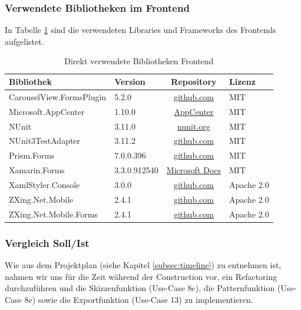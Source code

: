 \subsubsection{Verwendete Bibliotheken im Frontend}
In Tabelle \ref{tab:verwendete-libraries-frontend} sind die verwendeten Libraries und Frameworks des Frontends aufgelistet.
\begin{table}[!h]
	\centering
	\begin{tabular}{| l | l | c | l |}
		\hline
		\textbf{Bibliothek} & \textbf{Version} & \textbf{Repository} & \textbf{Lizenz}\\
		\hline
		CarouselView.FormsPlugin & 5.2.0 & \href{https://github.com/alexrainman/CarouselView}{github.com} & MIT \\
		Microsoft.AppCenter & 1.10.0 & \href{https://visualstudio.microsoft.com/app-center/}{AppCenter} & MIT \\
		NUnit & 3.11.0 & \href{http://nunit.org}{nunit.org} & MIT\\
		NUnit3TestAdapter & 3.11.2 & \href{https://github.com/nunit/docs/wiki/Visual-Studio-Test-Adapter}{github.com} & MIT\\
		Prism.Forms & 7.0.0.396 & \href{https://github.com/PrismLibrary/Prism}{github.com} & MIT \\
		Xamarin.Forms & 3.3.0.912540 & \href{https://docs.microsoft.com/en-us/xamarin/xamarin-forms/}{Microsoft Docs} & MIT \\
		XamlStyler.Console & 3.0.0 & 
		\href{https://github.com/Xavalon/XamlStyler}{github.com} & Apache 2.0\\
		ZXing.Net.Mobile & 2.4.1 & \href{http://github.com/Redth/ZXing.Net.Mobile}{github.com} & Apache 2.0\\
		ZXing.Net.Mobile.Forms & 2.4.1 &
		\href{http://github.com/Redth/ZXing.Net.Mobile}{github.com} & Apache 2.0\\
		\hline
	\end{tabular}
	\caption{Direkt verwendete Bibliotheken Frontend}
	\label{tab:verwendete-libraries-frontend}
\end{table}


\subsubsection{Vergleich Soll/Ist}
Wie aus dem Projektplan (siehe Kapitel \ref{subsec:timeline}) zu entnehmen ist, nahmen wir uns für die Zeit während der Construction vor, ein Refactoring durchzuführen und die Skizzenfunktion (Use-Case 8c), die Patternfunktion (Use-Case 8e) sowie die Exportfunktion (Use-Case 13) zu implementieren. 

